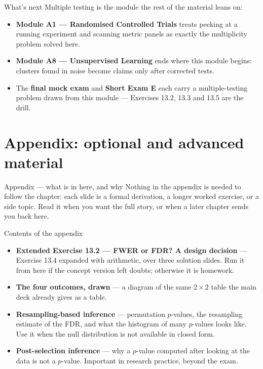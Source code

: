 \documentclass[aspectratio=169,11pt]{beamer}
\begin{document}
\begin{frame}{What's next}
  Multiple testing is the module the rest of the material leans on:
  \begin{itemize}
    \item \textbf{Module A1 --- Randomised Controlled Trials} treats peeking at
          a running experiment and scanning metric panels as exactly the
          multiplicity problem solved here.
    \item \textbf{Module A8 --- Unsupervised Learning} ends where this module
          begins: clusters found in noise become claims only after corrected
          tests.
    \item The \textbf{final mock exam} and \textbf{Short Exam E} each carry a
          multiple-testing problem drawn from this module --- Exercises 13.2,
          13.3 and 13.5 are the drill.
  \end{itemize}
\end{frame}


\appendix
\AtBeginSection[]{}
\section{Appendix: optional and advanced material}

\begin{frame}{Appendix --- what is in here, and why}
  \small
  Nothing in the appendix is needed to follow the chapter: each slide is a
  formal derivation, a longer worked exercise, or a side topic. Read it when
  you want the full story, or when a later chapter sends you back here.
  \begin{block}{Contents of the appendix}
    \begin{itemize}
      \item \textbf{Extended Exercise 13.2 --- FWER or FDR? A design decision} --- Exercise 13.4 expanded with arithmetic, over three solution slides. Run it from here if the concept version left doubts; otherwise it is homework.
      \item \textbf{The four outcomes, drawn} --- a diagram of the same $2\times2$ table the main deck already gives as a table.
      \item \textbf{Resampling-based inference} --- permutation $p$-values, the resampling estimate of the FDR, and what the histogram of many $p$-values looks like. Use it when the null distribution is not available in closed form.
      \item \textbf{Post-selection inference} --- why a $p$-value computed after looking at the data is not a $p$-value. Important in research practice, beyond the exam.
    \end{itemize}
  \end{block}
\end{frame}
\end{document}
